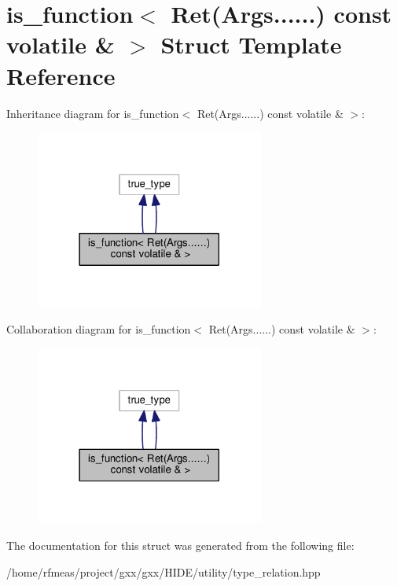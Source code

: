 \hypertarget{structis__function_3_01Ret_07Args_8_8_8_8_8_8_08_01const_01volatile_01_6_01_4}{}\section{is\+\_\+function$<$ Ret(Args......) const volatile \& $>$ Struct Template Reference}
\label{structis__function_3_01Ret_07Args_8_8_8_8_8_8_08_01const_01volatile_01_6_01_4}


Inheritance diagram for is\+\_\+function$<$ Ret(Args......) const volatile \& $>$\+:
\nopagebreak
\begin{figure}[H]
\begin{center}
\leavevmode
\includegraphics[width=213pt]{structis__function_3_01Ret_07Args_8_8_8_8_8_8_08_01const_01volatile_01_6_01_4__inherit__graph}
\end{center}
\end{figure}


Collaboration diagram for is\+\_\+function$<$ Ret(Args......) const volatile \& $>$\+:
\nopagebreak
\begin{figure}[H]
\begin{center}
\leavevmode
\includegraphics[width=213pt]{structis__function_3_01Ret_07Args_8_8_8_8_8_8_08_01const_01volatile_01_6_01_4__coll__graph}
\end{center}
\end{figure}


The documentation for this struct was generated from the following file\+:\begin{DoxyCompactItemize}
\item 
/home/rfmeas/project/gxx/gxx/\+H\+I\+D\+E/utility/type\+\_\+relation.\+hpp\end{DoxyCompactItemize}
